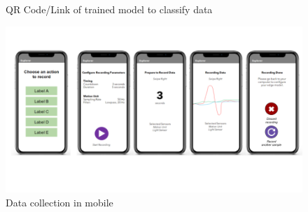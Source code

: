 \begin{figure}[ht]
    \centering
    \caption{QR Code/Link of trained model to classify data}
    \label{fig:model-link}
\end{figure}

\begin{figure}[ht]
    \centering
    \includegraphics[width = \textwidth]{mockups/9.png}
    \caption{Data collection in mobile}
    \label{fig:mobile}
\end{figure}